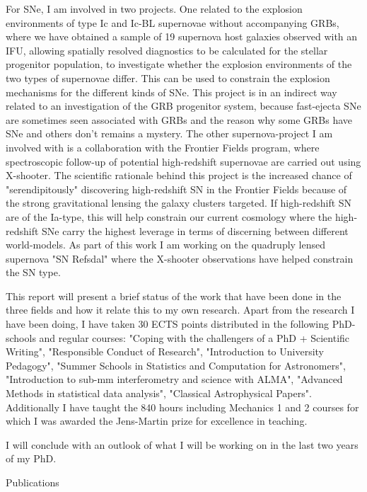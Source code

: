 For SNe, I am involved in two projects. One related to the explosion
environments of type Ic and Ic-BL supernovae without accompanying GRBs, where we
have obtained a sample of 19 supernova host galaxies observed with an IFU,
allowing spatially resolved diagnostics to be calculated for the stellar
progenitor population, to investigate whether the explosion environments of the
two types of supernovae differ. This can be used to constrain the explosion
mechanisms for the different kinds of SNe. This project is in an indirect way
related to an investigation of the GRB progenitor system, because fast-ejecta
SNe are sometimes seen associated with GRBs and the reason why some GRBs have
SNe and others don't remains a mystery. The other supernova-project I am
involved with is a collaboration with the Frontier Fields program, where
spectroscopic follow-up of potential high-redshift supernovae are carried out
using X-shooter. The scientific rationale behind this project is the increased
chance of "serendipitously" discovering high-redshift SN in the Frontier Fields
because of the strong gravitational lensing the galaxy clusters targeted. If
high-redshift SN are of the Ia-type, this will help constrain our current
cosmology where the high-redshift SNe carry the highest leverage in terms of
discerning between different world-models. As part of this work I am working on
the quadruply lensed supernova "SN Refsdal" where the X-shooter observations
have helped constrain the SN type.

This report will present a brief status of the work that have been done in the
three fields and how it relate this to my own research. Apart from the research
I have been doing, I have taken 30 ECTS points distributed in the following
PhD-schools and regular courses: "Coping with the challengers of a PhD +
Scientific Writing", "Responsible Conduct of Research", "Introduction to
University Pedagogy", "Summer Schools in Statistics and Computation for
Astronomers", "Introduction to sub-mm interferometry and science with ALMA",
"Advanced Methods in statistical data analysis", "Classical Astrophysical
Papers". Additionally I have taught the 840 hours including Mechanics 1 and 2
courses for which I was awarded the Jens-Martin prize for excellence in
teaching.

I will conclude with an outlook of what I will be working on in the last two
years of my PhD. 

\clearpage

{\Large Publications} \\

